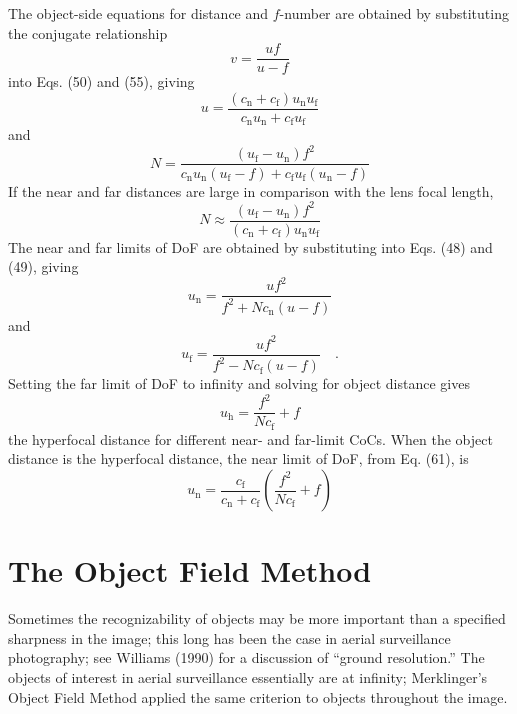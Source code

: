 \documentclass[11pt, oneside]{scrartcl}   	%
\begin{document}
The object-side equations for distance and $f$-number are obtained by
substituting the conjugate relationship
\begin{equation}
  \label{eq:57+++++}
  v=\frac{uf}{u-f}
\end{equation}
into Eqs. (50) and (55), giving
\begin{equation}
  \label{eq:58}
  u = \frac{(c_\mathrm{n}+c_\mathrm{f})u_\mathrm{n}u_\mathrm{f}}{c_\mathrm{n}u_\mathrm{n}+c_\mathrm{f}u_\mathrm{f}}
\end{equation}
and
\begin{equation}
  \label{eq:59}
  N=\frac{(u_\mathrm{f}-u_\mathrm{n})f^2}{c_\mathrm{n}u_\mathrm{n}(u_\mathrm{f}-f)+c_\mathrm{f}u_\mathrm{f}(u_\mathrm{n}-f)}
\end{equation}
If the near and far distances are large in comparison with the lens
focal length,
\begin{equation}
  \label{eq:1}
  N\approx\frac{(u_\mathrm{f}-u_\mathrm{n})f^2}{(c_\mathrm{n}+c_\mathrm{f})u_\mathrm{n}u_\mathrm{f}}
\end{equation}
The near and far limits of DoF are obtained by substituting  into
Eqs. (48) and (49), giving
\begin{equation}
  \label{eq:61}
  u_\mathrm{n}=\frac{uf^2}{f^2+N\!c_\mathrm{n}(u-f)}
\end{equation}
and
\begin{equation}
  \label{eq:62}
  u_\mathrm{f}=\frac{uf^2}{f^2-N\!c_\mathrm{f}(u-f)}\quad.
\end{equation}
Setting the far limit of DoF to infinity and solving for object
distance gives
\begin{equation}
  \label{eq:uh}
  u_\mathrm{h}=\frac{f^2}{N\!c_\mathrm{f}}+f
\end{equation}
the hyperfocal distance for different near- and far-limit CoCs. When
the object distance is the hyperfocal distance, the near limit of DoF,
from Eq. (61), is
\begin{equation}
  \label{eq:un}
  u_\mathrm{n} = \frac{c_\mathrm{f}}{c_\mathrm{n}+c_\mathrm{f}}\left(\frac{f^2}{N\!c_\mathrm{f}}+f\right)
\end{equation}

\section{The Object Field Method}
\label{sec:object-field-method}


Sometimes the recognizability of objects may be more important than a specified sharpness in the image; this long has been the case in aerial surveillance photography; see Williams (1990) for a discussion of “ground resolution.” The objects of interest in aerial surveillance essentially are at infinity; Merklinger’s Object Field Method applied the same criterion to objects throughout the image.
\end{document}
